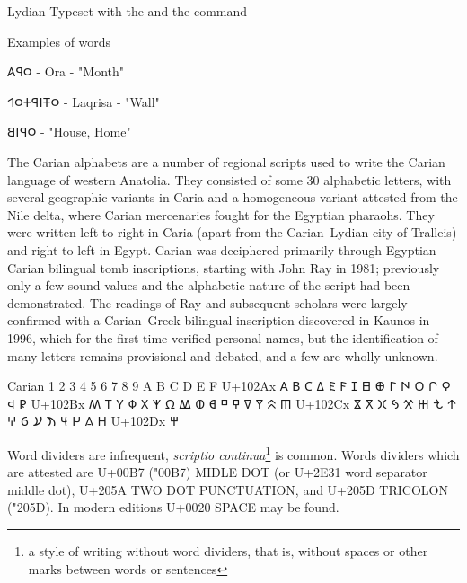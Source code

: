 \begin{description}
\begin{scriptexample}[]{Lydian}
Typeset with the  and the command \cmd{\lydian}
\end{scriptexample}

Examples of words

\bgroup\lydian
𐤬𐤭𐤠  - Ora - "Month"

𐤬𐤳𐤦𐤭𐤲𐤬𐤩  - Laqrisa - "Wall"

𐤬𐤭𐤦𐤡  - "House, Home"

\egroup

\item [Carian] The Carian alphabets are a number of regional scripts used to write the Carian language of western Anatolia. They consisted of some 30 alphabetic letters, with several geographic variants in Caria and a homogeneous variant attested from the Nile delta, where Carian mercenaries fought for the Egyptian pharaohs. They were written left-to-right in Caria (apart from the Carian–Lydian city of Tralleis) and right-to-left in Egypt. Carian was deciphered primarily through Egyptian–Carian bilingual tomb inscriptions, starting with John Ray in 1981; previously only a few sound values and the alphabetic nature of the script had been demonstrated. The readings of Ray and subsequent scholars were largely confirmed with a Carian–Greek bilingual inscription discovered in Kaunos in 1996, which for the first time verified personal names, but the identification of many letters remains provisional and debated, and a few are wholly unknown.

\begin{scriptexample}[]{Carian}
\bgroup
\carian
{}	1	2	3	4	5	6	7	8	9	A	B	C	D	E	F
U+102Ax	𐊠	𐊡	𐊢	𐊣	𐊤	𐊥	𐊦	𐊧	𐊨	𐊩	𐊪	𐊫	𐊬	𐊭	𐊮	𐊯
U+102Bx	𐊰	𐊱	𐊲	𐊳	𐊴	𐊵	𐊶	𐊷	𐊸	𐊹	𐊺	𐊻	𐊼	𐊽	𐊾	𐊿
U+102Cx	𐋀	𐋁	𐋂	𐋃	𐋄	𐋅	𐋆	𐋇	𐋈	𐋉	𐋊	𐋋	𐋌	𐋍	𐋎	𐋏
U+102Dx	𐋐
\egroup
\end{scriptexample}

\newfontfamily{}

Word dividers are infrequent, \emph{scriptio continua}\footnote{a style of writing without word dividers, that is, without spaces or other marks between words or sentences} is common. Words dividers which are attested are U+00B7 (\char"00B7) \textsc{MIDLE DOT} (or U+2E31 word separator middle dot), U+205A TWO DOT PUNCTUATION, and U+205D TRICOLON ({\oldpunctuation\char"205D}). In modern editions U+0020 SPACE may be found.

\end{description}